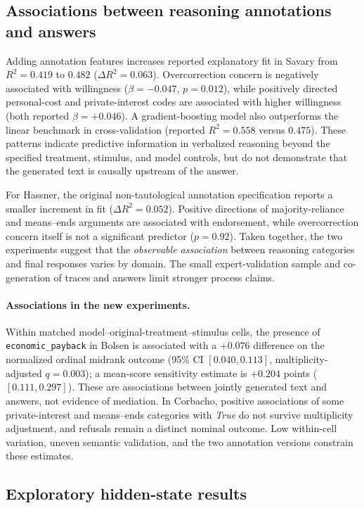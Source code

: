 \subsection{Associations between reasoning annotations and answers}

Adding annotation features increases reported explanatory fit in Savary from $R^2=0.419$ to $0.482$ ($\Delta R^2=0.063$). Overcorrection concern is negatively associated with willingness ($\beta=-0.047$, $p=0.012$), while positively directed personal-cost and private-interest codes are associated with higher willingness (both reported $\beta=+0.046$). A gradient-boosting model also outperforms the linear benchmark in cross-validation (reported $R^2=0.558$ versus $0.475$). These patterns indicate predictive information in verbalized reasoning beyond the specified treatment, stimulus, and model controls, but do not demonstrate that the generated text is causally upstream of the answer.

For Hassner, the original non-tautological annotation specification reports a smaller increment in fit ($\Delta R^2=0.052$). Positive directions of majority-reliance and means--ends arguments are associated with endorsement, while overcorrection concern itself is not a significant predictor ($p=0.92$). Taken together, the two experiments suggest that the \emph{observable association} between reasoning categories and final responses varies by domain. The small expert-validation sample and co-generation of traces and answers limit stronger process claims.

\paragraph{Associations in the new experiments.}
Within matched model--original-treatment--stimulus cells, the presence of \texttt{economic\_payback} in Bolsen is associated with a $+0.076$ difference on the normalized ordinal midrank outcome (95\% CI $[0.040,0.113]$, multiplicity-adjusted $q=0.003$); a mean-score sensitivity estimate is $+0.204$ points ($[0.111,0.297]$). These are associations between jointly generated text and answers, not evidence of mediation. In Corbacho, positive associations of some private-interest and means--ends categories with \emph{True} do not survive multiplicity adjustment, and refusals remain a distinct nominal outcome. Low within-cell variation, uneven semantic validation, and the two annotation versions constrain these estimates.

\subsection{Exploratory hidden-state results}

